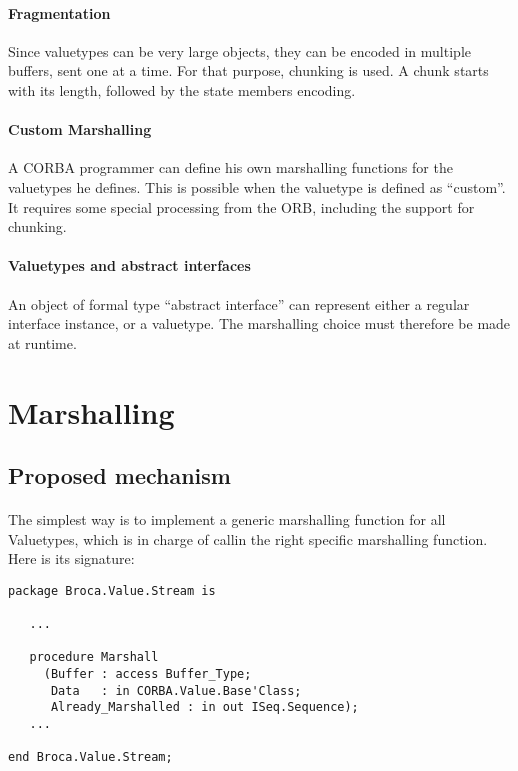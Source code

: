 \paragraph{Fragmentation}Since valuetypes can be very large objects,
they can be encoded in multiple buffers, sent one at a time. For that
purpose, chunking is used. A chunk starts with its length, followed by
the state members encoding.

\paragraph{Custom Marshalling}A CORBA programmer can define his own
marshalling functions for the valuetypes he defines. This is possible
when the valuetype is defined as ``custom''. It requires some
special processing from the ORB, including the support for chunking.

\paragraph{Valuetypes and abstract interfaces}An object of formal type
``abstract interface'' can represent either a regular interface
instance, or a valuetype. The marshalling choice must therefore be
made at runtime.

\section{Marshalling}

\subsection{Proposed mechanism}

\paragraph{}The simplest way is to implement a generic marshalling
function for all Valuetypes, which is in charge of callin the right
specific marshalling function. Here is its signature:

\begin{verbatim}
package Broca.Value.Stream is

   ...

   procedure Marshall
     (Buffer : access Buffer_Type;
      Data   : in CORBA.Value.Base'Class;
      Already_Marshalled : in out ISeq.Sequence);
   ...

end Broca.Value.Stream;
\end{verbatim}


